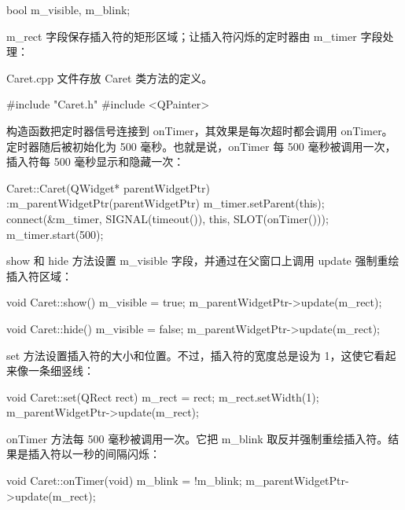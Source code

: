 \begin{codebox}
    bool m_visible, m_blink;
\end{codebox}

m\_rect 字段保存插入符的矩形区域；让插入符闪烁的定时器由 m\_timer 字段处理：

\begin{codebox}
    QRect m_rect;
    QTimer m_timer;
  };

#endif // CARET_H
\end{codebox}

Caret.cpp 文件存放 Caret 类方法的定义。

\medskip{}

\begin{codebox}
#include "Caret.h"
#include <QPainter>
\end{codebox}

构造函数把定时器信号连接到 onTimer，其效果是每次超时都会调用 onTimer。定时器随后被初始化为 500 毫秒。也就是说，onTimer 每 500 毫秒被调用一次，插入符每 500 毫秒显示和隐藏一次：

\begin{codebox}
Caret::Caret(QWidget* parentWidgetPtr)
  :m_parentWidgetPtr(parentWidgetPtr) {
  m_timer.setParent(this);
  connect(&m_timer, SIGNAL(timeout()), this, SLOT(onTimer()));
  m_timer.start(500);
}
\end{codebox}

show 和 hide 方法设置 m\_visible 字段，并通过在父窗口上调用 update 强制重绘插入符区域：

\begin{codebox}
void Caret::show() {
  m_visible = true;
  m_parentWidgetPtr->update(m_rect);
}

void Caret::hide() {
  m_visible = false;
  m_parentWidgetPtr->update(m_rect);
}
\end{codebox}

set 方法设置插入符的大小和位置。不过，插入符的宽度总是设为 1，这使它看起来像一条细竖线：

\begin{codebox}
void Caret::set(QRect rect) {
  m_rect = rect;
  m_rect.setWidth(1);
  m_parentWidgetPtr->update(m_rect);
}
\end{codebox}

onTimer 方法每 500 毫秒被调用一次。它把 m\_blink 取反并强制重绘插入符。结果是插入符以一秒的间隔闪烁：

\begin{codebox}
void Caret::onTimer(void) {
  m_blink = !m_blink;
  m_parentWidgetPtr->update(m_rect);
}
\end{codebox}

